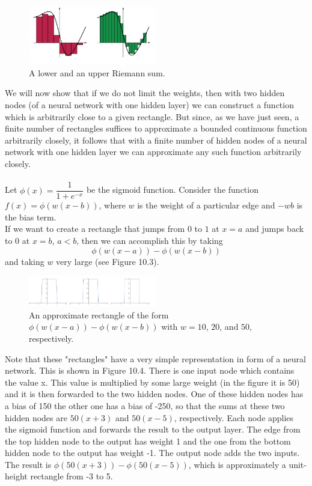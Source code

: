 \documentclass[twoside]{article}
\begin{document}
\begin{figure}[h]
\centering

\includegraphics[width=0.5\textwidth]{img/riemann.png}
\caption{A lower and an upper Riemann sum.}
\end{figure}

We will now show that if we do not limit the weights, then
with two hidden nodes (of a neural network with one hidden
layer) we can construct a function which is arbitrarily close
to a given rectangle. But since, as we have just seen, a finite number of rectangles suffices to approximate a bounded
continuous function arbitrarily closely, it follows that with a
finite number of hidden nodes of a neural network with one
hidden layer we can approximate any such function arbitrarily closely.\\ \\
Let $\phi(x) = \dfrac{1}{1+e^{-x}}$ be the sigmoid function. Consider the function $f(x) = \phi(w(x - b))$, where $w$ is the
weight of a particular edge and $-wb$ is the bias term. \\If we want to create a rectangle that jumps from
$0$ to $1$ at $x = a$ and jumps back to $0$ at $x = b$, $a < b$, then we can accomplish this by taking
$$\phi(w(x - a)) - \phi(w(x - b))$$
and taking $w$ very large (see Figure 10.3).


\begin{figure}[h]
\centering

\includegraphics[width=0.5\textwidth]{img/riemann_nn.png}
\caption{An approximate rectangle of the form $\phi(w(x -
a))-\phi(w(x-b))$ with $w = 10$, $20$, and $50$, respectively.}
\end{figure}

Note that these "rectangles"  have a very simple representation in
form of a neural network. This is shown in Figure 10.4. There is
one input node which contains the value x. This value is multiplied by some large weight (in the figure it is 50) and
it is then forwarded to the two hidden nodes. One of these
hidden nodes has a bias of 150 the other one has a bias
of -250, so that the sums at these two hidden nodes are
$50(x + 3)$ and $50(x - 5)$, respectively. Each node applies the
sigmoid function and forwards the result to the output layer.
The edge from the top hidden node to the output has weight
1 and the one from the bottom hidden node to the output
has weight -1. The output node adds the two inputs. The
result is $\phi(50(x+ 3))-\phi(50(x-5))$, which is approximately
a unit-height rectangle from -3 to 5.
\end{document}
